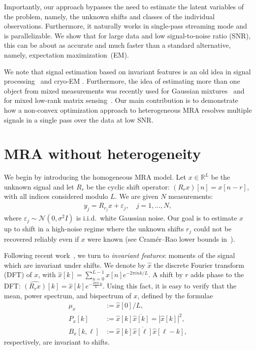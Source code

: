 \documentclass[english]{article}
\numberwithin{equation}{section}
\numberwithin{figure}{section}
\theoremstyle{plain}
\theoremstyle{definition}
\theoremstyle{remark}
\theoremstyle{plain}
\theoremstyle{remark}
\theoremstyle{plain}
\theoremstyle{plain}
\newcommand{\RL}{\mathbb{R}^L}
\begin{document}
Importantly, our approach bypasses the need to estimate the latent variables of the problem, namely, the unknown shifts and classes of the individual observations. Furthermore, it naturally works in single-pass streaming mode and is parallelizable. 
We show that for large data and low signal-to-noise ratio (SNR), this can be about as accurate and much faster than a standard alternative, namely, expectation maximization~(EM).

We note that signal estimation based on invariant features is an old idea in signal processing~\cite{sadler1992shift} and cryo-EM \cite{kam1980reconstruction,marabini1996new}. Furthermore, the idea of estimating more than one object from mixed measurements was recently used for Gaussian mixtures~\cite{hsu2013learning,anandkumar2014tensor} and for mixed low-rank matrix sensing~\cite{strohmer2017painless}.
Our main contribution is to demonstrate how a non-convex optimization approach to heterogeneous MRA resolves multiple signals in a single pass over the data at low SNR.








\section{MRA without heterogeneity} \label{sec:mra}

We begin by introducing the homogeneous MRA model.
Let $x \in \RL$ be the unknown signal and let $R_{r}$ be the cyclic shift operator: $(R_{r}x)[n] = x[n-r]$, with all indices considered modulo $L$.
We are given $N$ measurements:
\begin{align}
	y_j = R_{r_j}x + \varepsilon_j, \quad j = 1, \dots, N,
	\label{eq:mra}
\end{align}
where $\varepsilon_j \sim \mathcal{N}(0, \sigma^2 I)$ is i.i.d.\ white Gaussian noise. Our goal is to estimate $x$ up to shift in a high-noise regime where the unknown shifts $r_j$ could not be recovered reliably even if $x$ were known (see Cram\'er--Rao lower bounds in~\cite{aguerrebere2016fundamental}).

Following recent work~\cite{bendory2017bispectrum}, we turn to \emph{invariant features}: moments of the signal which are invariant under shifts. We denote by $\hat x$ the discrete Fourier transform (DFT) of $x$, with $\hat{x} [k]= \sum_{n=0}^{L-1}x[n]e^{-2\pi i n k/L}$.
A shift by $r$ adds phase to the DFT: $\widehat{(R_{r}x)}[k] = \hat x[k]e^{-\frac{2\pi i r}{L} k}$. 
Using this fact, it is easy to verify that the mean, power spectrum, and bispectrum of $x$, defined by the formulae
\begin{align}
	\mu_x  & := \hat x[0] /L, \\  
	P_x[k] & := \hat x[k] \overline{\hat x[k]} = |\hat x[k]|^2,\\  %
	B_x[k, \ell] & := \hat x[k] \overline{\hat x[\ell]} \hat x[\ell - k],
\end{align}
respectively, are invariant to shifts.
\end{document}
